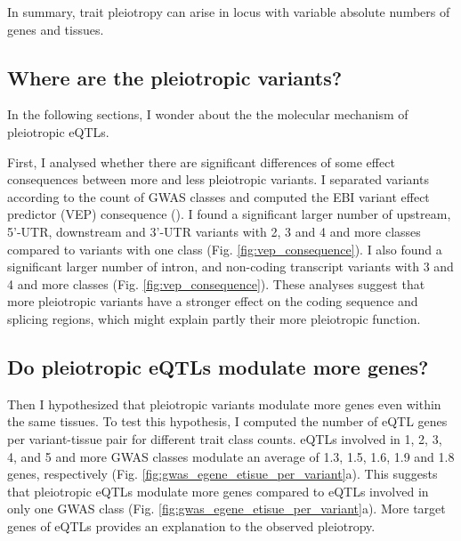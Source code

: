 In summary, trait pleiotropy can arise in locus with variable absolute numbers of genes and tissues.


\subsection*{Where are the pleiotropic variants?}


In the following sections, I wonder about the the molecular mechanism of pleiotropic eQTLs.
%

First, I analysed whether there are significant differences of some effect consequences between more and less pleiotropic variants.
%
I separated variants according to the count of GWAS classes and computed the EBI variant effect predictor (VEP) consequence (\citep{2016.Cunningham.McLaren}).
%
I found a significant larger number of upstream, 5'-UTR, downstream and 3'-UTR variants
with 2, 3 and 4 and more classes compared to variants with one class (Fig. \ref{fig:vep_consequence}).
%
I also found a significant larger number of intron, and non-coding transcript variants
with 3 and 4 and more classes (Fig. \ref{fig:vep_consequence}).
%
These analyses suggest that more pleiotropic variants have a stronger effect on
the coding sequence and splicing regions, which might explain partly their more pleiotropic function.

\subsection*{Do pleiotropic eQTLs modulate more genes?}

Then I hypothesized that pleiotropic variants modulate more genes even within the same tissues.
%
To test this hypothesis, I computed the number of eQTL genes per variant-tissue pair for different trait class counts.
%
%
eQTLs involved in 1, 2, 3, 4, and 5 and more GWAS classes modulate an average of 1.3, 1.5, 1.6, 1.9 and 1.8 genes, respectively (Fig. \ref{fig:gwas_egene_etisue_per_variant}a).
%
This suggests that pleiotropic eQTLs modulate more genes compared to eQTLs involved in only one GWAS class (Fig. \ref{fig:gwas_egene_etisue_per_variant}a).
%
More target genes of eQTLs provides an explanation to the observed pleiotropy.

